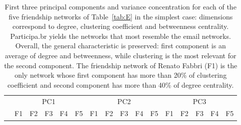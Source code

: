 \documentclass[%
 aip,
 jmp,%
 amsmath,amssymb,
 reprint,%
 floatfix,
]{revtex4-1}
\begin{document}
\begin{table}[!h]
	\caption{First three principal components and variance concentration for each of the five friendship networks of Table~\ref{tab:E} in the simplest case: dimensions correspond to degree, clustering coefficient and betweenness centrality. Participa.br yields the networks that most resemble the email networks. Overall, the general characteristic is preserved: first component is an average of degree and betweenness, while clustering is the most relevant for the second component. The friendship network of Renato Fabbri (F1) is the only network whose first component has more than 20\% of clustering coefficient and second component has more than 40\% of degree centrality.}
	\footnotesize
\begin{center}
\begin{tabular}{| l ||  c |c |c |c |c || c | c | c | c | c || c |c |c |c |c |	}\cline{2-16}
\multicolumn{1}{c|}{} & \multicolumn{5}{c||}{PC1}          & \multicolumn{5}{c||}{PC2} & \multicolumn{5}{c|}{PC3}  \\\cline{2-16}
	\multicolumn{1}{c|}{} & 
	F1 & F2 & F3 & F4 & F5 &	
	F1 & F2 & F3 & F4 & F5 &	
	F1 & F2 & F3 & F4 & F5 	\\\hline
	
\hline
\end{tabular}
\end{center}
\label{tab:pcaE1F}
\end{table}
\end{document}

